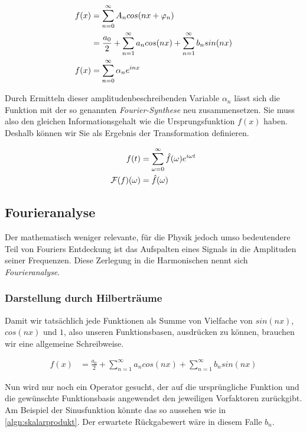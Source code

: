 \begin{align}
  f(x) &= \sum_{n = 0}^{\infty} A_n cos(n x + \varphi_n)  \notag\\
  &= \frac{a_0}{2} + \sum_{n = 1}^{\infty} a_n cos(n x) + \sum_{n = 1}^{\infty} b_n sin(n x) \label{algn:fourier_sums} \\
  f(x) &= \sum_{n = 0}^{\infty} \alpha_n e^{i n x} \label{algn:fourier_sums_complex}
\end{align}

Durch Ermitteln dieser amplitudenbeschreibenden Variable $\alpha_n$ lässt sich die Funktion mit der so genannten \emph{Fourier-Synthese} neu zusammensetzen. Sie muss also den gleichen Informationsgehalt wie die Ursprungsfunktion $f(x)$ haben. Deshalb können wir Sie als Ergebnis der Transformation definieren.

\begin{align}
  f(t) &= \sum_{\omega = 0}^{\infty} \hat{f}(\omega) e^{i \omega t} \notag \\
  \mathcal{F}(f)(\omega) &= \hat{f}(\omega) \label{algn:ftrans}
\end{align}

\subsection{Fourieranalyse}

Der mathematisch weniger relevante, für die Physik jedoch umso bedeutendere Teil von Fouriers Entdeckung ist das Aufspalten eines Signals in die Amplituden seiner Frequenzen. Diese Zerlegung in die Harmonischen nennt sich \emph{Fourieranalyse}.

\subsubsection*{Darstellung durch Hilberträume}
Damit wir tatsächlich jede Funktionen als Summe von Vielfache von $ sin(n x)$, $cos(n x)$ und $1$, also unseren Funktionsbasen, ausdrücken zu können, brauchen wir eine allgemeine Schreibweise.

\begin{align}
  f(x) &= \frac{a_0}{2} + \sum_{n = 1}^{\infty} a_n cos(n x) + \sum_{n = 1}^{\infty} b_n sin(n x) \label{algn:allgSinCos}
\end{align}

Nun wird nur noch ein Operator gesucht, der auf die ursprüngliche Funktion und die gewünschte Funktionsbasis angewendet den jeweiligen Vorfaktoren zurückgibt. Am Beispiel der Sinusfunktion könnte das so aussehen wie in \ref{algn:skalarprodukt}. Der erwartete Rückgabewert wäre in diesem Falle $b_n$.

